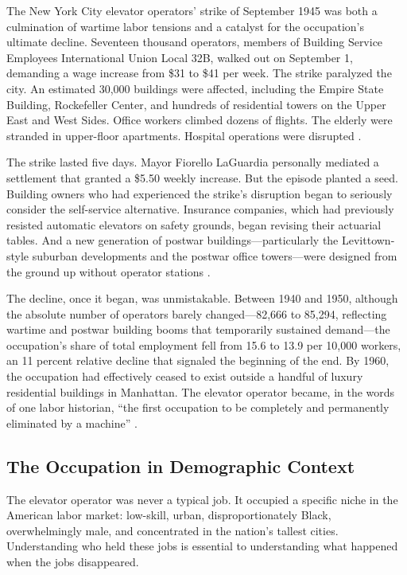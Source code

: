 \documentclass[12pt]{article}
\begin{document}
The New York City elevator operators' strike of September 1945 was both a culmination of wartime labor tensions and a catalyst for the occupation's ultimate decline. Seventeen thousand operators, members of Building Service Employees International Union Local 32B, walked out on September 1, demanding a wage increase from \$31 to \$41 per week. The strike paralyzed the city. An estimated 30,000 buildings were affected, including the Empire State Building, Rockefeller Center, and hundreds of residential towers on the Upper East and West Sides. Office workers climbed dozens of flights. The elderly were stranded in upper-floor apartments. Hospital operations were disrupted \citep{gray2013}.

The strike lasted five days. Mayor Fiorello LaGuardia personally mediated a settlement that granted a \$5.50 weekly increase. But the episode planted a seed. Building owners who had experienced the strike's disruption began to seriously consider the self-service alternative. Insurance companies, which had previously resisted automatic elevators on safety grounds, began revising their actuarial tables. And a new generation of postwar buildings---particularly the Levittown-style suburban developments and the postwar office towers---were designed from the ground up without operator stations \citep{price2013}.

The decline, once it began, was unmistakable. Between 1940 and 1950, although the absolute number of operators barely changed---82,666 to 85,294, reflecting wartime and postwar building booms that temporarily sustained demand---the occupation's share of total employment fell from 15.6 to 13.9 per 10,000 workers, an 11 percent relative decline that signaled the beginning of the end. By 1960, the occupation had effectively ceased to exist outside a handful of luxury residential buildings in Manhattan. The elevator operator became, in the words of one labor historian, ``the first occupation to be completely and permanently eliminated by a machine'' \citep{gray2013}.

\subsection{The Occupation in Demographic Context}

The elevator operator was never a typical job. It occupied a specific niche in the American labor market: low-skill, urban, disproportionately Black, overwhelmingly male, and concentrated in the nation's tallest cities. Understanding who held these jobs is essential to understanding what happened when the jobs disappeared.
\end{document}
